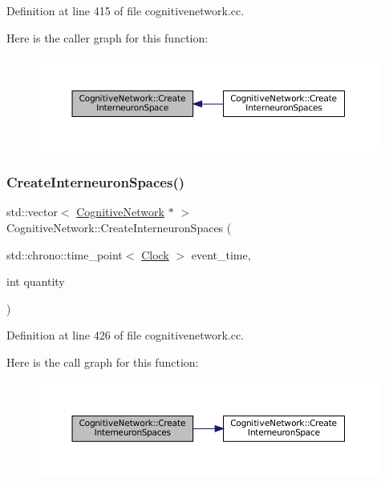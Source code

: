 Definition at line 415 of file cognitivenetwork.\+cc.

Here is the caller graph for this function\+:\nopagebreak
\begin{figure}[H]
\begin{center}
\leavevmode
\includegraphics[width=350pt]{class_cognitive_network_af0dc86c7905baae6f2b5efb3a65b8819_icgraph}
\end{center}
\end{figure}
\mbox{\label{class_cognitive_network_a2d671451d659079d5efb5cda10e48827}} 
\subsubsection{\texorpdfstring{Create\+Interneuron\+Spaces()}{CreateInterneuronSpaces()}}
{\footnotesize\ttfamily std\+::vector$<$ \mbox{\hyperlink{class_cognitive_network}{Cognitive\+Network}} $\ast$ $>$ Cognitive\+Network\+::\+Create\+Interneuron\+Spaces (\begin{DoxyParamCaption}\item[{std\+::chrono\+::time\+\_\+point$<$ \mbox{\hyperlink{universe_8h_a0ef8d951d1ca5ab3cfaf7ab4c7a6fd80}{Clock}} $>$}]{event\+\_\+time,  }\item[{int}]{quantity }\end{DoxyParamCaption})}



Definition at line 426 of file cognitivenetwork.\+cc.

Here is the call graph for this function\+:\nopagebreak
\begin{figure}[H]
\begin{center}
\leavevmode
\includegraphics[width=350pt]{class_cognitive_network_a2d671451d659079d5efb5cda10e48827_cgraph}
\end{center}
\end{figure}
\mbox{\label{class_cognitive_network_a9b5fcaf824d5b587775e7c44630affe6}} 
